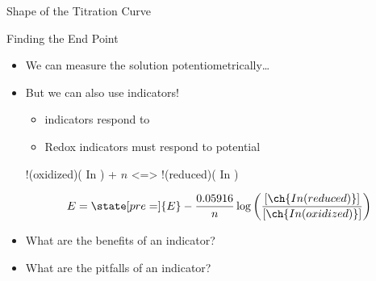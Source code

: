 \documentclass[notes=show]{beamer}
\begin{document}
\begin{frame}{Shape of the Titration Curve}
	\only<+>{}



\end{frame}

\begin{frame}{Finding the End Point}
	\begin{itemize}
		\item We can measure the solution potentiometrically\ldots

			\pause

		\item But we can also use indicators!
			\begin{itemize}
				\item \pH{} indicators respond to \pH{}
				\item Redox indicators must respond to potential
			\end{itemize}

			\begin{reaction*}
				!(oxidized)( In ) + $n$\el{} <=> !(reduced)( In
				)
			\end{reaction*}

			\begin{equation*}
				E = \state[pre=]{E} - \frac{0.05916}{n} \log
				\left( \frac{
					[\ch{In(reduced)}]}
					{[\ch{In(oxidized)}]} \right)
			\end{equation*}
		\item What are the benefits of an indicator?
		\item What are the pitfalls of an indicator?
	\end{itemize}
\end{frame}
\end{document}
